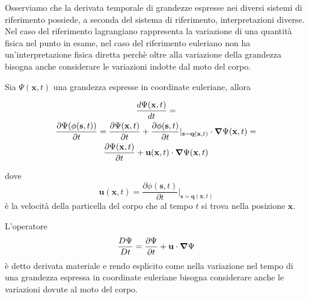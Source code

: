 Osserviamo che la derivata temporale di grandezze espresse nei diversi sistemi di riferimento possiede, a seconda del sistema di riferimento, interpretazioni diverse.
Nel caso del riferimento lagrangiano rappresenta la variazione di una quantità fisica nel punto in esame, nel caso del riferimento euleriano non ha un'interpretazione fisica diretta perchè oltre alla variazione della grandezza bisogna anche considerare le variazioni indotte dal moto del corpo.

Sia $\Psi(\mathbf{x},t)$ una grandezza espresse in coordinate euleriane, allora

\begin{multline*}
\frac{d\Psi(\mathbf{x},t)}{dt} = \\
\frac{\partial \Psi(\phi(\mathbf{s},t))}{\partial t} = 
\frac{\partial \Psi(\mathbf{x},t)}{\partial t} + \frac{\partial\phi(\mathbf{s},t)}{\partial t}\vert_{\mathbf{s} = \mathbf{q}(\mathbf{x},t)}
\cdot \boldsymbol{\nabla}\Psi(\mathbf{x},t) = \\
\frac{\partial \Psi(\mathbf{x},t)}{\partial t} + \mathbf{u}(\mathbf{x},t)\cdot \boldsymbol{\nabla}\Psi(\mathbf{x},t)
\end{multline*}

dove 
\begin{equation*}
\mathbf{u}(\mathbf{x},t) = \frac{\partial\phi(\mathbf{s},t)}{\partial t}|_{\mathbf{s} = \mathbf{q}(\mathbf{x},t)}
\end{equation*}
è la velocità della particella del corpo che al tempo $t$ si trova nella posizione $\mathbf{x}$.

L'operatore
\begin{equation*}
\frac{D\Psi}{Dt} = \frac{\partial\Psi}{\partial t} + \mathbf{u}\cdot\boldsymbol{\nabla}\Psi
\end{equation*}
è detto derivata materiale e rendo esplicito come nella variazione nel tempo di una grandezza espressa in coordinate euleriane bisogna considerare anche le variazioni dovute al moto del corpo.

